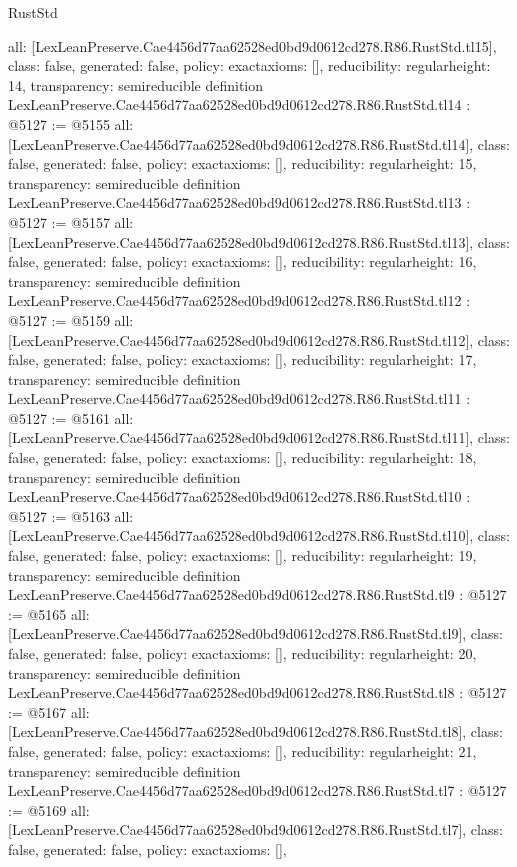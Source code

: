 \begin{lexlean}{RustStd}
\begin{coremodule}
{  all: [LexLeanPreserve.Cae4456d77aa62528ed0bd9d0612cd278.R86.RustStd.tl15],
  class: false,
  generated: false,
  policy: exact{axioms: []},
  reducibility: regular{height: 14},
  transparency: semireducible
}
definition LexLeanPreserve.Cae4456d77aa62528ed0bd9d0612cd278.R86.RustStd.tl14 : @5127 := @5155 {
  all: [LexLeanPreserve.Cae4456d77aa62528ed0bd9d0612cd278.R86.RustStd.tl14],
  class: false,
  generated: false,
  policy: exact{axioms: []},
  reducibility: regular{height: 15},
  transparency: semireducible
}
definition LexLeanPreserve.Cae4456d77aa62528ed0bd9d0612cd278.R86.RustStd.tl13 : @5127 := @5157 {
  all: [LexLeanPreserve.Cae4456d77aa62528ed0bd9d0612cd278.R86.RustStd.tl13],
  class: false,
  generated: false,
  policy: exact{axioms: []},
  reducibility: regular{height: 16},
  transparency: semireducible
}
definition LexLeanPreserve.Cae4456d77aa62528ed0bd9d0612cd278.R86.RustStd.tl12 : @5127 := @5159 {
  all: [LexLeanPreserve.Cae4456d77aa62528ed0bd9d0612cd278.R86.RustStd.tl12],
  class: false,
  generated: false,
  policy: exact{axioms: []},
  reducibility: regular{height: 17},
  transparency: semireducible
}
definition LexLeanPreserve.Cae4456d77aa62528ed0bd9d0612cd278.R86.RustStd.tl11 : @5127 := @5161 {
  all: [LexLeanPreserve.Cae4456d77aa62528ed0bd9d0612cd278.R86.RustStd.tl11],
  class: false,
  generated: false,
  policy: exact{axioms: []},
  reducibility: regular{height: 18},
  transparency: semireducible
}
definition LexLeanPreserve.Cae4456d77aa62528ed0bd9d0612cd278.R86.RustStd.tl10 : @5127 := @5163 {
  all: [LexLeanPreserve.Cae4456d77aa62528ed0bd9d0612cd278.R86.RustStd.tl10],
  class: false,
  generated: false,
  policy: exact{axioms: []},
  reducibility: regular{height: 19},
  transparency: semireducible
}
definition LexLeanPreserve.Cae4456d77aa62528ed0bd9d0612cd278.R86.RustStd.tl9 : @5127 := @5165 {
  all: [LexLeanPreserve.Cae4456d77aa62528ed0bd9d0612cd278.R86.RustStd.tl9],
  class: false,
  generated: false,
  policy: exact{axioms: []},
  reducibility: regular{height: 20},
  transparency: semireducible
}
definition LexLeanPreserve.Cae4456d77aa62528ed0bd9d0612cd278.R86.RustStd.tl8 : @5127 := @5167 {
  all: [LexLeanPreserve.Cae4456d77aa62528ed0bd9d0612cd278.R86.RustStd.tl8],
  class: false,
  generated: false,
  policy: exact{axioms: []},
  reducibility: regular{height: 21},
  transparency: semireducible
}
definition LexLeanPreserve.Cae4456d77aa62528ed0bd9d0612cd278.R86.RustStd.tl7 : @5127 := @5169 {
  all: [LexLeanPreserve.Cae4456d77aa62528ed0bd9d0612cd278.R86.RustStd.tl7],
  class: false,
  generated: false,
  policy: exact{axioms: []},
}
\end{coremodule}
\end{lexlean}
